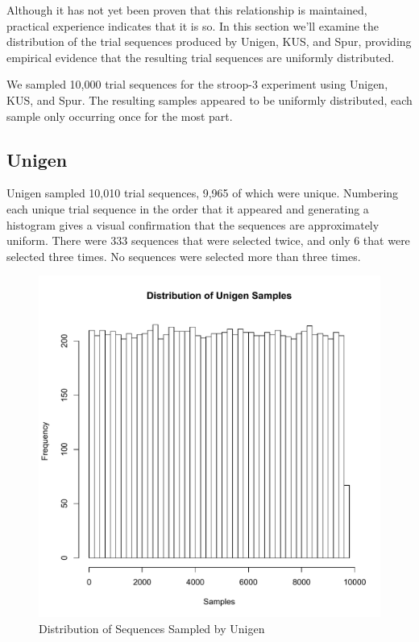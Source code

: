 Although it has not yet been proven that this relationship is maintained, practical experience indicates that it is so. In this section we'll examine the distribution of the trial sequences produced by Unigen, KUS, and Spur, providing empirical evidence that the resulting trial sequences are uniformly distributed.

We sampled 10,000 trial sequences for the stroop-3 experiment using Unigen, KUS, and Spur. The resulting samples appeared to be uniformly distributed, each sample only occurring once for the most part.


\subsection{Unigen}

Unigen sampled 10,010 trial sequences, 9,965 of which were unique. Numbering each unique trial sequence in the order that it appeared and generating a histogram gives a visual confirmation that the sequences are approximately uniform. There were 333 sequences that were selected twice, and only 6 that were selected three times. No sequences were selected more than three times.

\begin{figure}[t]
\centering
\centerline{\includegraphics[origin=c,width=12cm]{../figures/unigen-samples.pdf}}
\caption{Distribution of Sequences Sampled by Unigen}
\label{fig:unigen_samples}
\end{figure}


